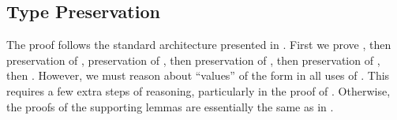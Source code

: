 \subsection{Type Preservation}
\label{sec:cps:cbv:proof}
The  proof follows the standard architecture presented
in .
First we prove , then preservation of ,
preservation of , then preservation of , then
preservation of , then .
However, we must reason about  ``values'' of the form
\im{\cpscappe{\cpse}{\cpsA}{\cpsk}} in all uses of .
This requires a few extra steps of reasoning, particularly in the proof of
.
Otherwise, the proofs of the supporting lemmas are essentially the same as in
.

